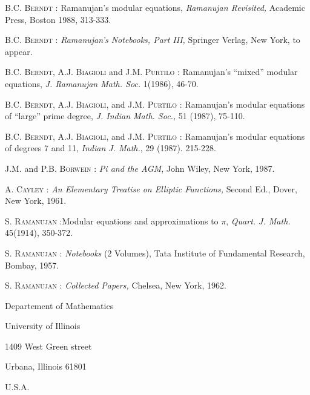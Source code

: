 \begin{thebibliography}{99}
 \textsc{B.C. Berndt} : Ramanujan's modular equations, \textit{Ramanujan Revisited,} Academic Press, Boston 1988, 313-333.

 \textsc{B.C. Berndt} : \textit{Ramanujan's Notebooks, Part III,} Springer Verlag, New York, to appear.

 \textsc{B.C. Berndt, A.J. Biagioli} and \textsc{J.M. Purtilo} : Ramanujan's ``mixed'' modular equations, \textit{J. Ramanujan Math. Soc. } 1(1986), 46-70.

 \textsc{B.C. Berndt, A.J. Biagioli,} and \textsc{J.M. Purtilo} : Ramanujan's modular equations of ``large'' prime degree, \textit{J. Indian Math. Soc.,} 51 (1987), 75-110.

 \textsc{B.C. Berndt, A.J. Biagioli,} and \textsc{J.M. Purtilo} : Ramanujan's modular equations of degrees 7 and 11, \textit{Indian J. Math.}, 29 (1987). 215-228.

 \textsc{J.M.} and \textsc{P.B. Borwein} : \textit{Pi and the AGM}, John Wiley, New York, 1987.

 \textsc{A. Cayley} : \textit{An Elementary Treatise on Elliptic Functions,} Second Ed., Dover, New York, 1961.

 \textsc{S. Ramanujan} :\pageoriginale  Modular equations and approximations to $\pi$, \textit{Quart. J. Math.} 45(1914), 350-372.

 \textsc{S. Ramanujan} : \textit{Notebooks} (2 Volumes), Tata Institute of Fundamental Research, Bombay, 1957.

 \textsc{S. Ramanujan} : \textit{Collected Papers,} Chelsea, New York, 1962.
\end{thebibliography}

\medskip
\noindent
{\small Departement of Mathematics}

\noindent
{\small University of Illinois}

\noindent
{\small 1409 West Green street}

\noindent
{\small Urbana, Illinois 61801}

\noindent
{\small U.S.A.}
